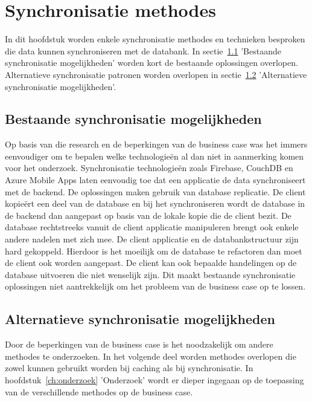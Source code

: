
\chapter{Synchronisatie methodes}
\label{ch:synchronisatiemethdodes}


In dit hoofdstuk worden enkele synchronisatie methodes en technieken besproken die data kunnen synchroniseren met de databank. In sectie~\ref{sec:bestaande} 'Bestaande synchronisatie mogelijkheden' worden kort de bestaande oplossingen overlopen. Alternatieve synchronisatie patronen worden overlopen in sectie~\ref{sec:alternatieven} 'Alternatieve synchronisatie mogelijkheden'.

\section{Bestaande synchronisatie mogelijkheden}
\label{sec:bestaande}
Op basis van die research en de beperkingen van de business case was het immers eenvoudiger om te bepalen welke technologie\"en al dan niet in aanmerking komen voor het onderzoek. Synchronisatie technologie\"en zoals Firebase, CouchDB en Azure Mobile Apps laten eenvoudig toe dat een applicatie de data synchroniseert met de backend. De oplossingen maken gebruik van database replicatie. De client kopie\"ert een deel van de database en bij het synchroniseren wordt de database in de backend dan aangepast op basis van de lokale kopie die de client bezit. De database rechtstreeks vanuit de client applicatie manipuleren brengt ook enkele andere nadelen met zich mee. De client applicatie en de databankstructuur zijn hard gekoppeld. Hierdoor is het moeilijk om de database te refactoren dan moet de client ook worden aangepast. De client kan ook bepaalde handelingen op de database uitvoeren die niet wenselijk zijn. Dit maakt bestaande synchronisatie oplossingen niet aantrekkelijk om het probleem van de business case op te lossen.

\section{Alternatieve synchronisatie mogelijkheden}
\label{sec:alternatieven}
Door de beperkingen van de business case is het noodzakelijk om andere methodes te onderzoeken. In het volgende deel worden methodes overlopen die zowel kunnen gebruikt worden bij caching als bij synchronisatie. In hoofdstuk~\ref{ch:onderzoek} 'Onderzoek' wordt er dieper ingegaan op de toepassing van de verschillende methodes op de business case.

